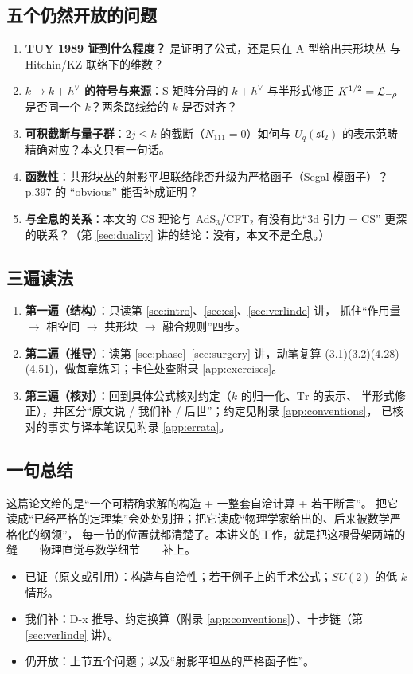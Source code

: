 \subsection{五个仍然开放的问题}
\begin{enumerate}[leftmargin=*]
  \item \textbf{TUY 1989 证到什么程度？} 是证明了公式，还是只在 A 型给出共形块丛
        与 Hitchin/KZ 联络下的维数？
  \item \textbf{$k\to k+h^\vee$ 的符号与来源}：S 矩阵分母的 $k+h^\vee$ 与半形式修正
        $K^{1/2}=\mathcal{L}_{-\rho}$ 是否同一个 $k$？两条路线给的 $k$ 是否对齐？
  \item \textbf{可积截断与量子群}：$2j\le k$ 的截断（$N_{111}=0$）如何与 $U_q(\mathfrak{sl}_2)$
        的表示范畴精确对应？本文只有一句话。
  \item \textbf{函数性}：共形块丛的射影平坦联络能否升级为严格函子（Segal 模函子）？
        p.397 的 “obvious” 能否补成证明？
  \item \textbf{与全息的关系}：本文的 CS 理论与 AdS$_3$/CFT$_2$ 有没有比“3d 引力 = CS”
        更深的联系？（第 \ref{sec:duality} 讲的结论：没有，本文不是全息。）
\end{enumerate}

\subsection{三遍读法}
\begin{enumerate}[leftmargin=*]
  \item \textbf{第一遍（结构）}：只读第 \ref{sec:intro}、\ref{sec:cs}、\ref{sec:verlinde} 讲，
        抓住“作用量 $\to$ 相空间 $\to$ 共形块 $\to$ 融合规则”四步。
  \item \textbf{第二遍（推导）}：读第 \ref{sec:phase}--\ref{sec:surgery} 讲，动笔复算
        (3.1)(3.2)(4.28)(4.51)，做每章练习；卡住处查附录 \ref{app:exercises}。
  \item \textbf{第三遍（核对）}：回到具体公式核对约定（$k$ 的归一化、$\mathrm{Tr}$ 的表示、
        半形式修正），并区分“原文说 / 我们补 / 后世”；约定见附录 \ref{app:conventions}，
        已核对的事实与译本笔误见附录 \ref{app:errata}。
\end{enumerate}

\subsection{一句总结}
这篇论文给的是“一个可精确求解的构造 + 一整套自洽计算 + 若干断言”。
把它读成“已经严格的定理集”会处处别扭；把它读成“物理学家给出的、后来被数学严格化的纲领”，
每一节的位置就都清楚了。本讲义的工作，就是把这根骨架两端的缝——物理直觉与数学细节——补上。

\begin{boundary}
\begin{itemize}
  \item 已证（原文或引用）：构造与自洽性；若干例子上的手术公式；$SU(2)$ 的低 $k$ 情形。
  \item 我们补：D-x 推导、约定换算（附录 \ref{app:conventions}）、十步链（第 \ref{sec:verlinde} 讲）。
  \item 仍开放：上节五个问题；以及“射影平坦丛的严格函子性”。
\end{itemize}
\end{boundary}
